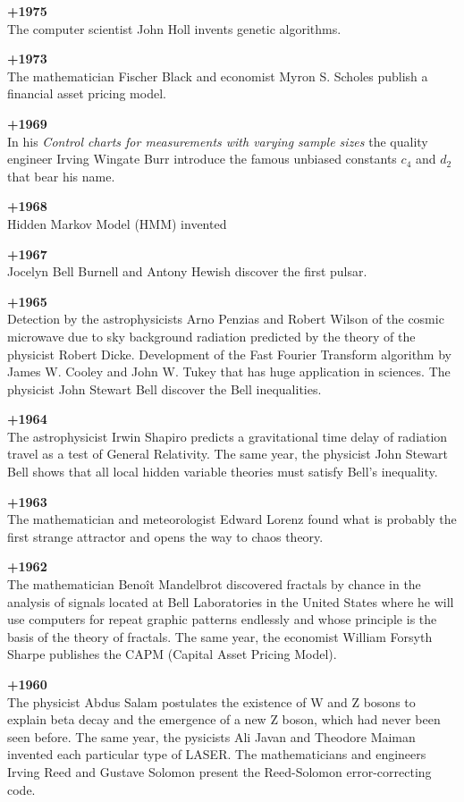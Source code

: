 \textbf{+1975}\\
The computer scientist John Holl invents genetic algorithms.

\textbf{+1973}\\
The mathematician Fischer Black and economist Myron S. Scholes publish a financial asset pricing model.

\textbf{+1969}\\
In his \textit{Control charts for measurements with varying sample sizes} the quality engineer Irving Wingate Burr introduce the famous unbiased constants $c_4$ and $d_2$ that bear his name.

\textbf{+1968}\\
Hidden Markov Model (HMM) invented

\textbf{+1967}\\
Jocelyn Bell Burnell and Antony Hewish discover the first pulsar.

\textbf{+1965}\\
Detection by the astrophysicists Arno Penzias and Robert Wilson of the cosmic microwave due to sky background radiation predicted by the theory of the physicist Robert Dicke. Development of the Fast Fourier Transform algorithm by James W. Cooley and John W. Tukey that has huge application in sciences. The physicist John Stewart Bell discover the Bell inequalities.

\textbf{+1964}\\
The astrophysicist Irwin Shapiro predicts a gravitational time delay of radiation travel as a test of General Relativity. The same year, the physicist John Stewart Bell shows that all local hidden variable theories must satisfy Bell's inequality.

\textbf{+1963}\\
The mathematician and meteorologist Edward Lorenz found what is probably the first strange attractor and opens the way to chaos theory.

\textbf{+1962}\\
The mathematician Benoît Mandelbrot discovered fractals by chance in the analysis of signals located at Bell Laboratories in the United States where he will use computers for repeat graphic patterns endlessly and whose principle is the basis of the theory of fractals. The same year, the economist William Forsyth Sharpe publishes the CAPM (Capital Asset Pricing Model). 

\textbf{+1960}\\
The physicist Abdus Salam postulates the existence of W and Z bosons to explain beta decay and the emergence of a new Z boson, which had never been seen before. The same year, the pysicists Ali Javan and Theodore Maiman invented each particular type of LASER. The mathematicians and engineers Irving Reed and Gustave Solomon present the Reed-Solomon error-correcting code.

